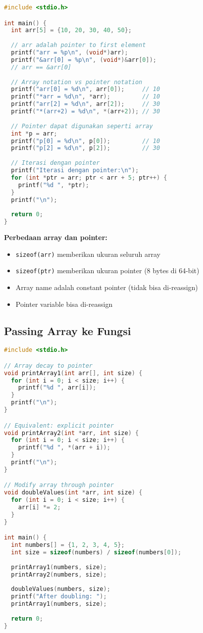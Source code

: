 \documentclass[../main.tex]{subfiles}
\begin{document}
\begin{lstlisting}[language=C, caption={Array dan pointer di C}]
#include <stdio.h>

int main() {
  int arr[5] = {10, 20, 30, 40, 50};
  
  // arr adalah pointer to first element
  printf("arr = %p\n", (void*)arr);
  printf("&arr[0] = %p\n", (void*)&arr[0]);
  // arr == &arr[0]
  
  // Array notation vs pointer notation
  printf("arr[0] = %d\n", arr[0]);     // 10
  printf("*arr = %d\n", *arr);         // 10
  printf("arr[2] = %d\n", arr[2]);     // 30
  printf("*(arr+2) = %d\n", *(arr+2)); // 30
  
  // Pointer dapat digunakan seperti array
  int *p = arr;
  printf("p[0] = %d\n", p[0]);         // 10
  printf("p[2] = %d\n", p[2]);         // 30
  
  // Iterasi dengan pointer
  printf("Iterasi dengan pointer:\n");
  for (int *ptr = arr; ptr < arr + 5; ptr++) {
    printf("%d ", *ptr);
  }
  printf("\n");
  
  return 0;
}
\end{lstlisting}

\textbf{Perbedaan array dan pointer:}
\begin{itemize}
  \item \texttt{sizeof(arr)} memberikan ukuran seluruh array
  \item \texttt{sizeof(ptr)} memberikan ukuran pointer (8 bytes di 64-bit)
  \item Array name adalah constant pointer (tidak bisa di-reassign)
  \item Pointer variable bisa di-reassign
\end{itemize}

\subsection{Passing Array ke Fungsi}

\begin{lstlisting}[language=C, caption={Array sebagai parameter fungsi}]
#include <stdio.h>

// Array decay to pointer
void printArray1(int arr[], int size) {
  for (int i = 0; i < size; i++) {
    printf("%d ", arr[i]);
  }
  printf("\n");
}

// Equivalent: explicit pointer
void printArray2(int *arr, int size) {
  for (int i = 0; i < size; i++) {
    printf("%d ", *(arr + i));
  }
  printf("\n");
}

// Modify array through pointer
void doubleValues(int *arr, int size) {
  for (int i = 0; i < size; i++) {
    arr[i] *= 2;
  }
}

int main() {
  int numbers[] = {1, 2, 3, 4, 5};
  int size = sizeof(numbers) / sizeof(numbers[0]);
  
  printArray1(numbers, size);
  printArray2(numbers, size);
  
  doubleValues(numbers, size);
  printf("After doubling: ");
  printArray1(numbers, size);
  
  return 0;
}
\end{lstlisting}
\end{document}

